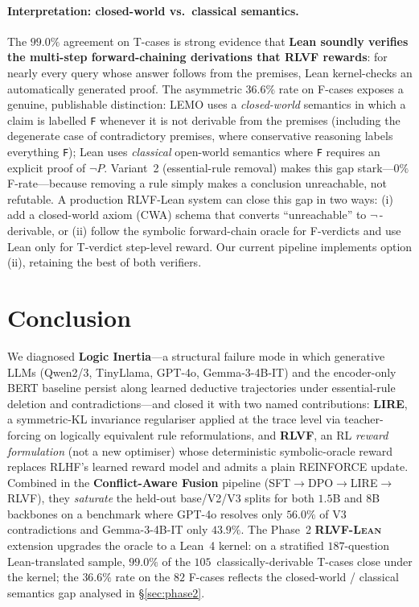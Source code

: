 \documentclass{article}
\begin{document}
\paragraph{Interpretation: closed-world vs.\ classical semantics.}
The $99.0\%$ agreement on T-cases is strong evidence that \textbf{Lean soundly
verifies the multi-step forward-chaining derivations that RLVF rewards}: for
nearly every query whose answer follows from the premises, Lean kernel-checks
an automatically generated proof. The asymmetric $36.6\%$ rate on F-cases
exposes a genuine, publishable distinction: LEMO uses a \emph{closed-world}
semantics in which a claim is labelled \texttt{F} whenever it is not derivable
from the premises (including the degenerate case of contradictory premises,
where conservative reasoning labels everything \texttt{F}); Lean uses
\emph{classical} open-world semantics where \texttt{F} requires an explicit
proof of $\neg P$. Variant~2 (essential-rule removal) makes this gap
stark---$0\%$ F-rate---because removing a rule simply makes a conclusion
unreachable, not refutable. A production RLVF-Lean system can close this gap
in two ways: (i) add a closed-world axiom (CWA) schema that converts
``unreachable'' to $\neg$\,-derivable, or (ii) follow the symbolic forward-chain
oracle for F-verdicts and use Lean only for T-verdict step-level reward. Our
current pipeline implements option (ii), retaining the best of both verifiers.

\section{Conclusion}

We diagnosed \textbf{Logic Inertia}---a structural failure mode in which generative LLMs (Qwen2/3, TinyLlama, GPT-4o, Gemma-3-4B-IT) and the encoder-only BERT baseline persist along learned deductive trajectories under essential-rule deletion and contradictions---and closed it with two named contributions: \textbf{LIRE}, a symmetric-KL invariance regulariser applied at the trace level via teacher-forcing on logically equivalent rule reformulations, and \textbf{\textsc{RLVF}}, an RL \emph{reward formulation} (not a new optimiser) whose deterministic symbolic-oracle reward replaces RLHF's learned reward model and admits a plain REINFORCE update. Combined in the \textbf{Conflict-Aware Fusion} pipeline (SFT$\to$DPO$\to$LIRE$\to$\textsc{RLVF}), they \emph{saturate} the held-out base/V2/V3 splits for both $1.5$B and $8$B backbones on a benchmark where GPT-4o resolves only $56.0\%$ of V3 contradictions and Gemma-3-4B-IT only $43.9\%$. The Phase~2 \textbf{\textsc{RLVF-Lean}} extension upgrades the oracle to a Lean~4 kernel: on a stratified $187$-question Lean-translated sample, $99.0\%$ of the $105$~classically-derivable T-cases close under the kernel; the $36.6\%$ rate on the $82$ F-cases reflects the closed-world / classical semantics gap analysed in \S\ref{sec:phase2}.
\end{document}

